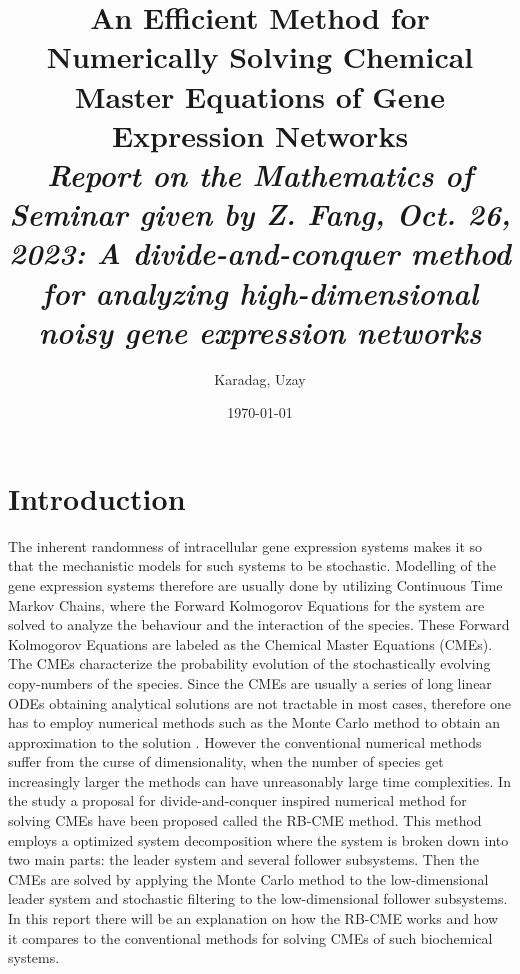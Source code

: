 \documentclass[11pt]{isr} %
\title{{\bf An Efficient Method for Numerically Solving Chemical Master Equations of Gene Expression Networks}\\
{\em Report on the Mathematics of  Seminar given by Z. Fang, Oct. 26, 2023:  A divide-and-conquer method for analyzing high-dimensional noisy gene expression networks}} %
\author{Karadag, Uzay} %
\date{\today} %
\begin{document}
\maketitle %




\section*{Introduction}
The inherent randomness of intracellular gene expression systems makes it so that the mechanistic models for such systems to be stochastic. Modelling of the gene expression systems therefore are usually done by utilizing Continuous Time Markov Chains, where the Forward Kolmogorov Equations for the system are solved to analyze the behaviour and the interaction of the species. These Forward Kolmogorov Equations are labeled as the Chemical Master Equations (CMEs). The CMEs characterize the probability evolution of the stochastically evolving copy-numbers of the species. Since the CMEs are usually a series of long linear ODEs obtaining analytical solutions are not tractable in most cases, therefore one has to employ numerical methods such as the Monte Carlo method to obtain an approximation to the solution \cite{zechner}. However the conventional numerical methods suffer from the curse of dimensionality, when the number of species get increasingly larger the methods can have unreasonably large time complexities. In the study a proposal for divide-and-conquer inspired numerical method for solving CMEs have been proposed called the RB-CME method. This method employs a optimized system decomposition where the system is broken down into two main parts: the leader system and several follower subsystems. Then the CMEs are solved by applying the Monte Carlo method to the low-dimensional leader system and stochastic filtering \cite{bain} to the low-dimensional follower subsystems. In this report there will be an explanation on how the RB-CME works and how it compares to the conventional methods for solving CMEs of such biochemical systems.
\end{document}

